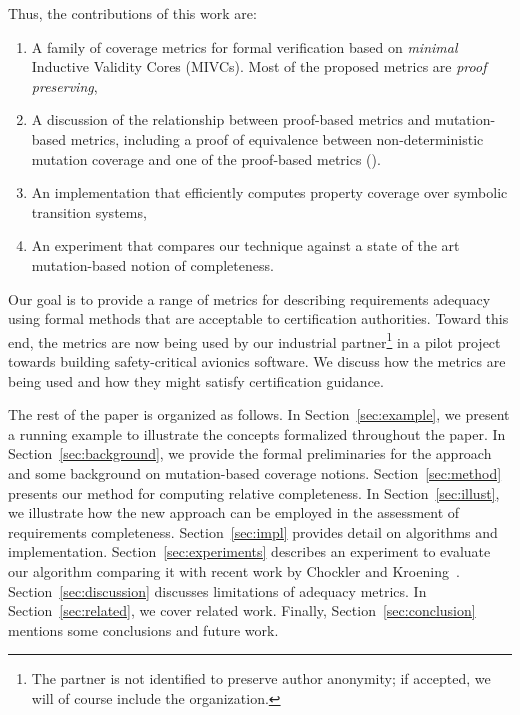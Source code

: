 Thus, the contributions of this work are:
\begin{enumerate}
\item A family of coverage metrics for formal verification based on \emph{minimal} Inductive Validity Cores (MIVCs).  Most of the proposed metrics are {\em proof preserving},
\item A discussion of the relationship between proof-based metrics and mutation-based metrics, including a proof of equivalence between non-deterministic mutation coverage and one of the proof-based metrics (\mustcov).
\item An implementation that efficiently computes property coverage over symbolic transition systems,
\item An experiment that compares our technique against a state of the art mutation-based notion of completeness.
\end{enumerate}
\vspace{-0.01in}
\noindent Our goal is to provide a range of metrics for describing requirements adequacy using formal methods that are acceptable to certification authorities.  Toward this end, the metrics are now being used by our industrial partner\footnote{The partner is not identified to preserve author anonymity; if accepted, we will of course include the organization.} in a pilot project towards building safety-critical avionics software.  We discuss how the metrics are being used and how they might satisfy certification guidance.



The rest of the paper is organized as follows.  In Section~\ref{sec:example}, we present a running example to illustrate the concepts formalized throughout the paper.  In Section~\ref{sec:background}, we provide the formal preliminaries for the approach and some background on mutation-based coverage notions.  Section~\ref{sec:method} presents our method for computing relative completeness.
In Section~\ref{sec:illust}, we illustrate how the new approach can be employed in the assessment of requirements completeness.
Section~\ref{sec:impl} provides detail on algorithms and implementation. Section~\ref{sec:experiments} describes an experiment to evaluate our algorithm comparing it with recent work by Chockler and Kroening~\cite{chockler2010coverage}.
Section~\ref{sec:discussion} discusses limitations of adequacy metrics.  In Section~\ref{sec:related}, we cover related work.  Finally, Section~\ref{sec:conclusion} mentions some conclusions and future work.

